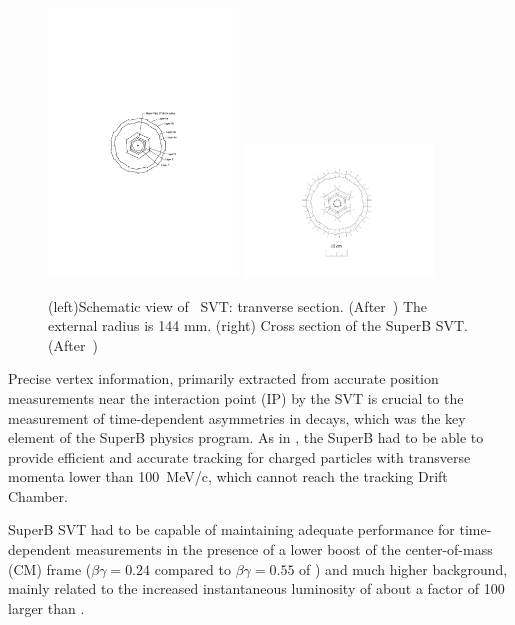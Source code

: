 \begin{figure}
\centering
\includegraphics[width=0.45\textwidth]{miniSVT.pdf}
\includegraphics[width=0.45\textwidth]{miniSuperBSVT.pdf}
\caption{\label{fig:svt} (left)Schematic view of \babar\ SVT: tranverse section. (After~\cite{AUBERT20021}) The external radius is 144 mm. (right) Cross section of the SuperB SVT. (After~\cite{Baszczyk:2013xua}) }
\end{figure}


Precise vertex information, primarily extracted from accurate position measurements near the 
interaction point (IP) by the SVT  is crucial to the measurement of time-dependent \CP asymmetries 
in \Bz decays, which was the  key element of the SuperB physics program. As in \babar, the SuperB 
had to be able to provide efficient and accurate tracking for  charged particles with transverse 
momenta lower than 100~MeV/c, which cannot reach the tracking Drift Chamber.

SuperB SVT had to be capable of maintaining adequate performance for time-dependent 
measurements
 in the presence of a lower boost of the center-of-mass (CM) frame
($\beta\gamma = 0.24$ compared to $\beta\gamma = 0.55$ of \babar) and much higher background,
mainly related to the increased instantaneous luminosity of about a factor of 100 larger than \babar.

